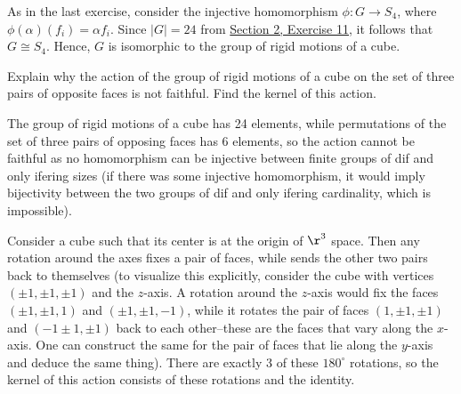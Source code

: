\begin{problems}
\begin{sol}
        As in the last exercise, consider the injective homomorphism $\phi : G \to S_4$, where $\phi(\alpha)(f_i) = \alpha f_i$. Since $|G| = 24$ from \hyperref[ex1.2.11]{Section 2, Exercise 11}, it follows that $G \cong S_4$. Hence, $G$ is isomorphic to the group of rigid motions of a cube.
    \end{sol}
    \item Explain why the action of the group of rigid motions of a cube on the set of three pairs of opposite faces is not faithful. Find the kernel of this action.
    \begin{sol}
        The group of rigid motions of a cube has 24 elements, while permutations of the set of three pairs of opposing faces has 6 elements, so the action cannot be faithful as no homomorphism can be injective between finite groups of dif and only ifering sizes (if there was some injective homomorphism, it would imply bijectivity between the two groups of dif and only ifering cardinality, which is impossible).
        
        Consider a cube such that its center is at the origin of $\r^3$ space. Then any rotation around the axes fixes a pair of faces, while sends the other two pairs back to themselves (to visualize this explicitly, consider the cube with vertices $(\pm 1, \pm 1, \pm 1)$ and the $z$-axis. A rotation around the $z$-axis would fix the faces $(\pm 1, \pm 1, 1)$ and $(\pm 1, \pm 1, -1)$, while it rotates the pair of faces $(1, \pm 1, \pm 1)$ and $(-1 \pm 1, \pm 1)$ back to each other--these are the faces that vary along the $x$-axis. One can construct the same for the pair of faces that lie along the $y$-axis and deduce the same thing). There are exactly 3 of these $180^\circ$ rotations, so the kernel of this action consists of these rotations and the identity.
    \end{sol}
\end{problems}